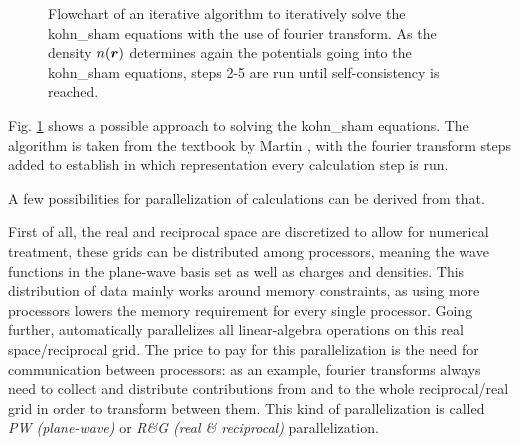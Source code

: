 \documentclass[main.tex]{subfiles}
\begin{document}
\begin{figure}[htb!]
{}
\caption{Flowchart of an iterative algorithm to iteratively solve the \acrshort{kohn_sham} equations with the use of fourier transform. As the density \(n(\vb*{r})\) determines again the potentials going into the \acrshort{kohn_sham} equations, steps 2-5 are run until self-consistency is reached.}
\label{fig:diagram-scf-calculations}
\end{figure}
Fig. \ref{fig:diagram-scf-calculations} shows a possible approach to solving the \acrshort{kohn_sham} equations.
The algorithm is taken from the textbook by Martin \cite{martin_electronic_2004}, with the fourier transform steps added to establish in which representation every calculation step is run.



A few possibilities for parallelization of calculations can be derived from that.

First of all, the real and reciprocal space are discretized to allow for numerical treatment, these grids can be distributed among processors, meaning the wave functions in the plane-wave basis set as well as charges and densities.
This distribution of data mainly works around memory constraints, as using more processors lowers the memory requirement for every single processor.
Going further, \QE automatically parallelizes all linear-algebra operations on this real space/reciprocal grid.
The price to pay for this parallelization is the need for communication between processors: as an example, fourier transforms always need to collect and distribute contributions from and to the whole reciprocal/real grid in order to transform between them.
This kind of parallelization is called \emph{PW (plane-wave)} or \emph{R\&G (real \& reciprocal)} parallelization. 
\end{document}
